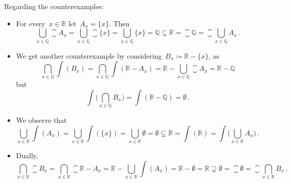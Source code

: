 Regarding the counterexamples:
\begin{itemize}

	\item
		For every~$x ∈ ℝ$ let~$A_x = \{ x \}$.
		Then
		\[
			⋃_{x ∈ ℚ} \closure{A_x}
			=
			⋃_{x ∈ ℚ} \closure{ \{ x \} }
			=
			⋃_{x ∈ ℚ} {} \{ x \}
			=
			ℚ
			⊊
			ℝ
			=
			\closure{ ℚ }
			=
			\closure{ ⋃_{x ∈ ℚ} A_x } \,.
		\]

	\item
		We get another counterexample by considering~$B_x ≔ ℝ - \{ x \}$, as
		\[
			⋂_{x ∈ ℚ} \int(B_x)
			=
			⋂_{x ∈ ℚ} \int(ℝ - A_x)
			=
			ℝ - ⋃_{x ∈ ℚ} \closure{A_x}
			=
			ℝ - ℚ
		\]
		but
		\[
			\int\biggl( ⋂_{x ∈ ℚ} B_x \biggr)
			=
			\int( ℝ - ℚ )
			=
			∅ \,.
		\]

	\item
		We observe that
		\[
			⋃_{x ∈ ℝ} \int(A_x)
			=
			⋃_{x ∈ ℝ} \int(\{ x \})
			=
			⋃_{x ∈ ℝ} ∅
			=
			∅
			⊊
			ℝ
			=
			\int(ℝ)
			=
			\int\biggl( ⋃_{x ∈ ℝ} A_x \biggr) \,.
		\]

	\item
		Dually,
		\[
			⋂_{x ∈ ℝ} \closure{B_x}
			=
			⋂_{x ∈ ℝ} \closure{ℝ - A_x}
			=
			ℝ - ⋃_{x ∈ ℝ} \int(A_x)
			=
			ℝ - ∅
			=
			ℝ
			⊋
			∅
			=
			\closure{∅}
			=
			\closure{ ⋂_{x ∈ ℝ} B_x } \,.
		\]

\end{itemize}

